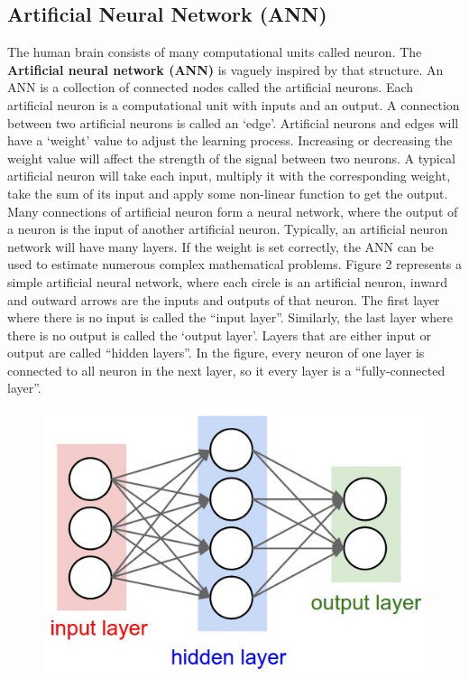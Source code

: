 \subsection{Artificial Neural Network (ANN)}
The human brain consists of many computational units called neuron. The \textbf{Artificial neural network (ANN)} is vaguely inspired by that structure. An ANN is a collection of connected nodes called the artificial neurons. Each artificial neuron is a computational unit with inputs and an output. A connection between two artificial neurons is called an ‘edge’. Artificial neurons and edges will have a ‘weight’ value to adjust the learning process. Increasing or decreasing the weight value will affect the strength of the signal between two neurons. A typical artificial neuron will take each input, multiply it with the corresponding weight, take the sum of its input and apply some non-linear function to get the output. Many connections of artificial neuron form a neural network, where the output of a neuron is the input of another artificial neuron. Typically, an artificial neuron network will have many layers. If the weight is set correctly, the ANN can be used to estimate numerous complex mathematical problems.
Figure 2 represents a simple artificial neural network, where each circle is an artificial neuron, inward and outward arrows are the inputs and outputs of that neuron. The first layer where there is no input is called the “input layer”. Similarly, the last layer where there is no output is called the ‘output layer’. Layers that are either input or output are called “hidden layers”. In the figure, every neuron of one layer is connected to all neuron in the next layer, so it every layer is a “fully-connected layer”.
\begin{center}
  \begin{figure}[H]
  \centering
  \includegraphics[width=0.75\columnwidth]{images/chap2/neural_net.png}
  \label{chap2:neural_net}
  \end{figure}
\end{center}

